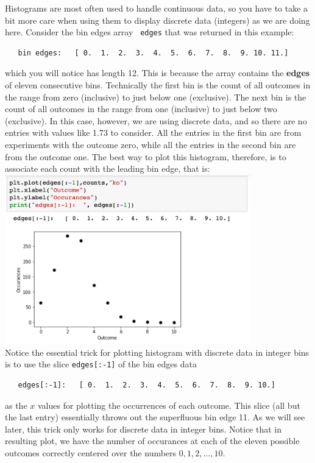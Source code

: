Histograms are most often used to handle continuous data, so you
have to take a bit more care when using them to display discrete data
(integers) as we are doing here.  Consider the bin edges array {\tt
  edges} that was returned in this example:
\begin{verbatim}
   bin edges:   [ 0.  1.  2.  3.  4.  5.  6.  7.  8.  9. 10. 11.]
\end{verbatim}
which you will notice has length 12.  This is because the
array contains the {\bf edges} of eleven consecutive bins.  Technically the first bin
is the count of all outcomes in the range from zero (inclusive) to
just below one (exclusive).  The next bin is the count of all outcomes
in the range from one (inclusive) to just below two (exclusive).  In
this case, however, we are using discrete data, and so there are no entries with values like 1.73 to consider.
All the entries in the first bin are from experiments with the outcome
zero, while all the entries in the second bin are from the outcome
one.  The best way to plot this histogram, therefore, is
to associate each count with the leading bin edge, that is:\\
\includegraphics[width=0.8\textwidth]{figs/labs/distributions/plothist.png} \\
Notice the essential trick for plotting histogram with discrete data in integer bins is to use the slice {\tt edges[:-1]} of the bin edges data
\begin{verbatim}
   edges[:-1]:   [ 0.  1.  2.  3.  4.  5.  6.  7.  8.  9. 10.]
\end{verbatim}
as the $x$ values for plotting the occurrences of each outcome.  This
slice (all but the last entry) essentially throws out the superfluous
bin edge 11.  As we will see later, this trick only works for discrete
data in integer bins.  Notice that in resulting plot, we have the number of occurances
at each of the eleven possible outcomes correctly centered over the
numbers $0,1,2,\ldots,10.$

